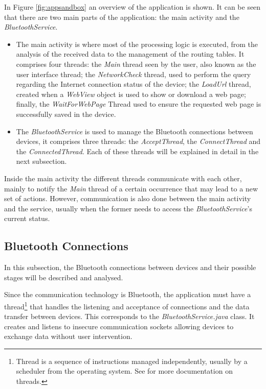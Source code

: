 In Figure \ref{fig:appsandbox} an overview of the application is shown. It can be seen that there are two main parts of the application: the main activity and the \textit{BluetoothService}.
\begin{itemize}

\item The main activity is where most of the processing logic is executed, from the analysis of the received data to the management of the routing tables. It comprises four threads: the \textit{Main} thread seen by the user, also known as the user interface thread; the \textit{NetworkCheck} thread, used to perform the query regarding the Internet connection status of the device; the \textit{LoadUrl} thread, created when a \textit{WebView} object is used to show or download a web page; finally, the \textit{WaitForWebPage} Thread used to ensure the requested web page is successfully saved in the device.

\item The \textit{BluetoothService} is used to manage the Bluetooth connections between devices, it comprises three threads: the \textit{AcceptThread}, the \textit{ConnectThread} and the \textit{ConnectedThread}. Each of these threads will be explained in detail in the next subsection.

\end{itemize}

Inside the main activity the different threads communicate with each other, mainly to notify the \textit{Main} thread of a certain occurrence that may lead to a new set of actions. However, communication is also done between the main activity and the service, usually when the former needs to access the \textit{BluetoothService}'s current status.

\subsection{Bluetooth Connections}
\label{subsec:btconn}

In this subsection, the Bluetooth connections between devices and their possible stages will be described and analysed.

Since the communication technology is Bluetooth, the application must have a thread\footnote{Thread is a sequence of instructions managed independently, usually by a scheduler from the operating system. See \cite{threads} for more documentation on threads.} that handles the listening and acceptance of connections and the data transfer between devices. This corresponds to the \textit{BluetoothService.java} class. It creates and listens to insecure communication sockets allowing devices to exchange data without user intervention.


